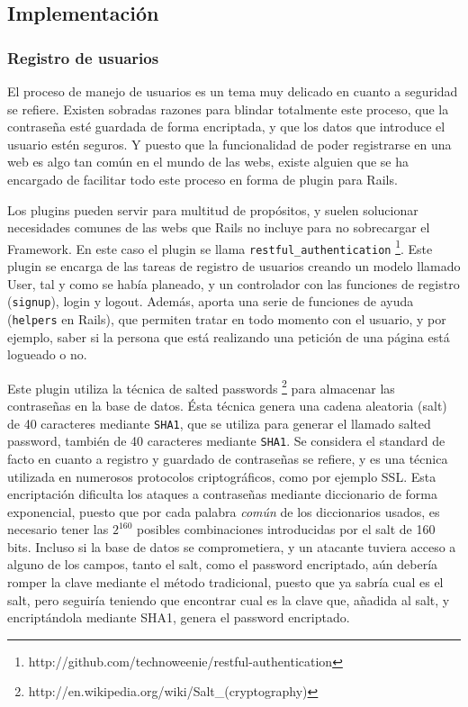 
\subsection{Implementación} %
\label{sub:implementación}

\subsubsection{Registro de usuarios} %
\label{ssub:registro_de_usuarios}

El proceso de manejo de usuarios es un tema muy delicado en cuanto a seguridad se refiere. Existen sobradas razones para blindar totalmente este proceso, que la contraseña esté guardada de forma encriptada, y que los datos que introduce el usuario estén seguros. Y puesto que la funcionalidad de poder registrarse en una web es algo tan común en el mundo de las webs, existe alguien que se ha encargado de facilitar todo este proceso en forma de plugin para Rails.

Los plugins pueden servir para multitud de propósitos, y suelen solucionar necesidades comunes de las webs que Rails no incluye para no sobrecargar el Framework. En este caso el plugin se llama \texttt{restful\_authentication} \footnote{http://github.com/technoweenie/restful-authentication}. Este plugin se encarga de las tareas de registro de usuarios creando un modelo llamado User, tal y como se había planeado, y un controlador con las funciones de registro (\texttt{signup}), login y logout. Además, aporta una serie de funciones de ayuda (\texttt{helpers} en Rails), que permiten tratar en todo momento con el usuario, y por ejemplo, saber si la persona que está realizando una petición de una página está logueado o no. 

Este plugin utiliza la técnica de salted passwords \footnote{http://en.wikipedia.org/wiki/Salt\_(cryptography)} para almacenar las contraseñas en la base de datos. Ésta técnica genera una cadena aleatoria (salt) de 40 caracteres mediante \texttt{SHA1}, que se utiliza para generar el llamado salted password, también de 40 caracteres mediante \texttt{SHA1}. Se considera el standard de facto en cuanto a registro y guardado de contraseñas se refiere, y es una técnica utilizada en numerosos protocolos criptográficos, como por ejemplo SSL. Esta encriptación dificulta los ataques a contraseñas mediante diccionario de forma exponencial, puesto que por cada palabra \emph{común} de los diccionarios usados, es necesario tener las $2^{160}$ posibles combinaciones introducidas por el salt de 160 bits. Incluso si la base de datos se comprometiera, y un atacante tuviera acceso a alguno de los campos, tanto el salt, como el password encriptado, aún debería romper la clave mediante el método tradicional, puesto que ya sabría cual es el salt, pero seguiría teniendo que encontrar cual es la clave que, añadida al salt, y encriptándola mediante SHA1, genera el password encriptado.


